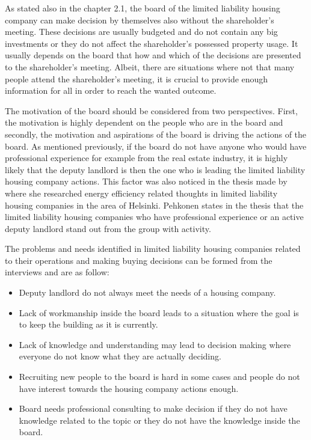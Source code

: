 As stated also in the chapter 2.1, the board of the limited liability housing company can make decision by themselves also without the shareholder's meeting. These decisions are usually budgeted and do not contain any big investments or they do not affect the shareholder's possessed property usage. It usually depends on the board that how and which of the decisions are presented to the shareholder's meeting. Albeit, there are situations where not that many people attend the shareholder's meeting, it is crucial to provide enough information for all in order to reach the wanted outcome.

The motivation of the board should be considered from two perspectives. First, the motivation is highly dependent on the people who are in the board and secondly, the motivation and aspirations of the board is driving the actions of the board. As mentioned previously, if the board do not have anyone who would have professional experience for example from the real estate industry, it is highly likely that the deputy landlord is then the one who is leading the limited liability housing company actions. This factor was also noticed in the thesis made by \textcite{PehkonenThesis:2012} where she researched energy efficiency related thoughts in limited liability housing companies in the area of Helsinki. Pehkonen states in the thesis that the limited liability housing companies who have professional experience or an active deputy landlord stand out from the group with activity.

The problems and needs identified in limited liability housing companies related to their operations and making buying decisions can be formed from the interviews and are as follow:
\begin{itemize}
	\setlength{\itemsep}{1pt}
	\item Deputy landlord do not always meet the needs of a housing company.
	\item Lack of workmanship inside the board leads to a situation where the goal is to keep the building as it is currently.
	\item Lack of knowledge and understanding may lead to decision making where everyone do not know what they are actually deciding.
	\item Recruiting new people to the board is hard in some cases and people do not have interest towards the housing company actions enough.
	\item Board needs professional consulting to make decision if they do not have knowledge related to the topic or they do not have the knowledge inside the board.
\end{itemize}

